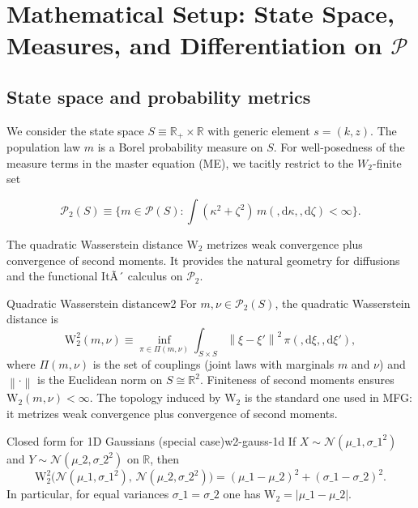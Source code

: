\documentclass[11pt,letterpaper,oneside]{article}
\numberwithin{equation}{section}
\newcommand{\R}{\mathbb{R}}
\newcommand{\1}{\mathbf{1}}
\newcommand{\diff}{,\mathrm{d}}
\newcommand{\norm}[1]{\left\lVert #1\right\rVert}
\begin{document}
\section{Mathematical Setup: State Space, Measures, and Differentiation on \texorpdfstring{$\mathcal P$}{P}}\label{sec:math-setup}

\subsection{State space and probability metrics}\label{sec:state-metrics}
We consider the state space $S\equiv \R_+\times\R$ with generic element $s=(k,z)$. The population law $m$ is a Borel probability measure on $S$. For well-posedness of the measure terms in the master equation (ME), we tacitly restrict to the $W_2$-finite set

$$
\mathcal P_2(S)\equiv\Big\{ m\in\mathcal P(S): \int (\kappa^2 + \zeta^2)\, m(\diff\kappa,\diff\zeta) < \infty\Big\}.
$$

The quadratic Wasserstein distance $\mathrm{W}_2$ metrizes weak convergence plus convergence of second moments. It provides the natural geometry for diffusions and the functional ItÃ´ calculus on $\mathcal P_2$.

\begin{definition}{Quadratic Wasserstein distance}{w2}
For $m,\nu\in\mathcal P_2(S)$, the quadratic Wasserstein distance is
\[
\mathrm W_2^2(m,\nu) \equiv \inf_{\pi\in\Pi(m,\nu)} \int_{S\times S} \! \norm{\xi-\xi'}^2\, \pi(\diff \xi,\diff \xi'),
\]
where $\Pi(m,\nu)$ is the set of couplings (joint laws with marginals $m$ and $\nu$) and $\norm{\cdot}$ is the Euclidean norm on $S\cong\R^2$. Finiteness of second moments ensures $\mathrm W_2(m,\nu)<\infty$. The topology induced by $\mathrm W_2$ is the standard one used in MFG: it metrizes weak convergence plus convergence of second moments.
\end{definition}

\begin{lemma}{Closed form for 1D Gaussians (special case)}{w2-gauss-1d}
If $X\sim\mathcal N(\mu\_1,\sigma\_1^2)$ and $Y\sim\mathcal N(\mu\_2,\sigma\_2^2)$ on $\R$, then
\[
\mathrm W_2^2\big(\mathcal N(\mu\_1,\sigma\_1^2),\,\mathcal N(\mu\_2,\sigma\_2^2)\big) 
= (\mu\_1-\mu\_2)^2 + (\sigma\_1-\sigma\_2)^2.
\]
In particular, for equal variances $\sigma\_1=\sigma\_2$ one has $\mathrm W_2\!=|\mu\_1-\mu\_2|$.
\end{lemma}
\end{document}
